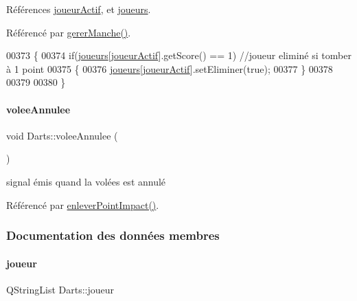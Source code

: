 Références \hyperlink{darts_8h_source_l00076}{joueur\+Actif}, et \hyperlink{darts_8h_source_l00073}{joueurs}.



Référencé par \hyperlink{darts_8cpp_source_l00303}{gerer\+Manche()}.


\begin{DoxyCode}
00373 \{
00374     \textcolor{keywordflow}{if}(\hyperlink{class_darts_a81bc116f3ae70cea1f492f87f01901c7}{joueurs}[\hyperlink{class_darts_a68fb01b9aad6502e4429dfbf2a72d50b}{joueurActif}].getScore() == 1)    \textcolor{comment}{//joueur eliminé si tomber à 1 point}
00375     \{
00376         \hyperlink{class_darts_a81bc116f3ae70cea1f492f87f01901c7}{joueurs}[\hyperlink{class_darts_a68fb01b9aad6502e4429dfbf2a72d50b}{joueurActif}].setEliminer(\textcolor{keyword}{true});
00377     \}
00378 
00379 
00380 \}
\end{DoxyCode}
\mbox{\label{class_darts_a78f609ea9e8867459804bad777ce39f3}} 
\paragraph{\texorpdfstring{volee\+Annulee}{voleeAnnulee}}
{\footnotesize\ttfamily void Darts\+::volee\+Annulee (\begin{DoxyParamCaption}{ }\end{DoxyParamCaption})\hspace{0.3cm}{\ttfamily [signal]}}



signal émis quand la volées est annulé 



Référencé par \hyperlink{darts_8cpp_source_l00274}{enlever\+Point\+Impact()}.



\subsubsection{Documentation des données membres}
\mbox{\label{class_darts_a97cc62d823c3d41604bb4a2d329ddfea}} 
\paragraph{\texorpdfstring{joueur}{joueur}}
{\footnotesize\ttfamily Q\+String\+List Darts\+::joueur\hspace{0.3cm}{\ttfamily [private]}}



